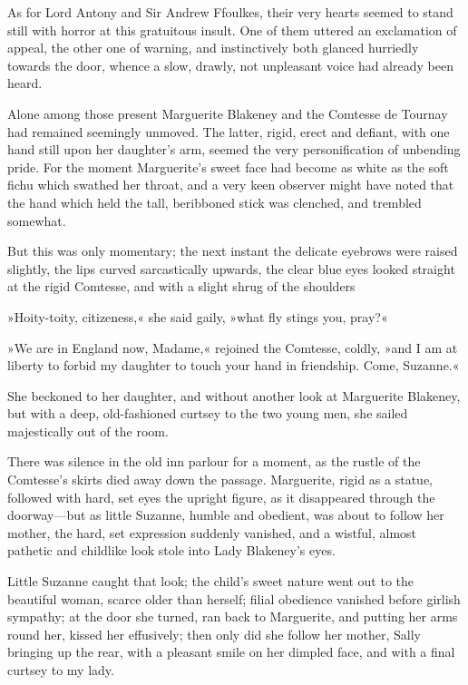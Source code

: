 As for Lord Antony and Sir Andrew Ffoulkes, their very hearts seemed to stand still with horror at this gratuitous insult. One of them uttered an exclamation of appeal, the other one of warning, and instinctively both glanced hurriedly towards the door, whence a slow, drawly, not unpleasant voice had already been heard.

Alone among those present Marguerite Blakeney and the Comt\-esse de Tournay had remained seemingly unmoved. The latter, rigid, erect and defiant, with one hand still upon her daughter's arm, seemed the very personification of unbending pride. For the moment Marguerite's sweet face had become as white as the soft fichu which swathed her throat, and a very keen observer might have noted that the hand which held the tall, beribboned stick was clenched, and trembled somewhat.

But this was only momentary; the next instant the delicate eyebrows were raised slightly, the lips curved sarcastically upwards, the clear blue eyes looked straight at the rigid Comtesse, and with a slight shrug of the shoulders\longdash


»Hoity-toity, citizeness,« she said gaily, »what fly stings you, pray?«

»We are in England now, Madame,« rejoined the Comtesse, coldly, »and I am at liberty to forbid my daughter to touch your hand in friendship. Come, Suzanne.«

She beckoned to her daughter, and without another look at Marguerite Blakeney, but with a deep, old-fashioned curtsey to the two young men, she sailed majestically out of the room.

There was silence in the old inn parlour for a moment, as the rustle of the Comtesse's skirts died away down the passage. Marguerite, rigid as a statue, followed with hard, set eyes the upright figure, as it disappeared through the doorway\allowbreak---\allowbreak but as little Suzanne, humble and obedient, was about to follow her mother, the hard, set expression suddenly vanished, and a wistful, almost pathetic and childlike look stole into Lady Blakeney's eyes.

Little Suzanne caught that look; the child's sweet nature went out to the beautiful woman, scarce older than herself; filial obedience vanished before girlish sympathy; at the door she turned, ran back to Marguerite, and putting her arms round her, kissed her effusively; then only did she follow her mother, Sally bringing up the rear, with a pleasant smile on her dimpled face, and with a final curtsey to my lady.

